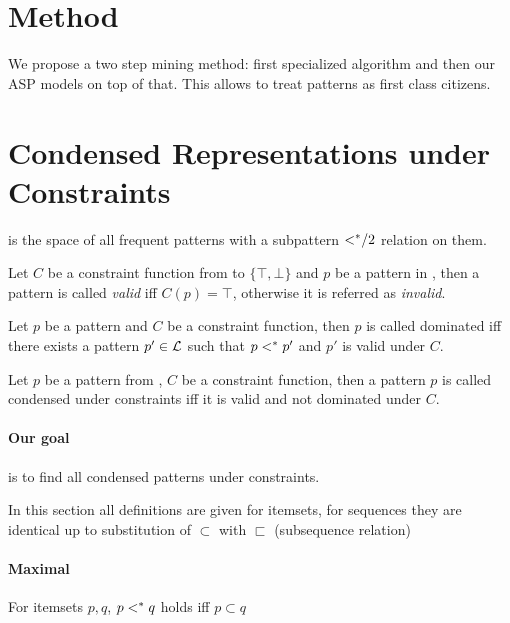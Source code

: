 \section{Method}
We propose a two step mining method: first specialized algorithm and then our ASP models on top of that. This allows to treat patterns as first class citizens. 

\section{Condensed Representations under Constraints}

\patternspace is the space of all frequent patterns with a subpattern ${<^*}/2$ relation on them.

\begin{definition}
  Let $C$ be a constraint function from \patternspace to $\{ \top, \bot \}$ and $p$ be a pattern in \patternspace, then a pattern is called \textit{valid} iff $C(p) = \top$, otherwise it is referred as \textit{invalid}.
\end{definition}

\begin{definition}
 Let  $p$ be a pattern and $C$ be a constraint function, then $p$ is called dominated iff there exists a pattern $p' \in \mathcal{L}$ such that $p <^* p'$ and $p'$ is valid under $C$. 
\end{definition}

\begin{definition}
Let $p$ be a pattern from \patternspace, $C$ be a constraint function, then a pattern $p$ is called condensed under constraints iff it is valid and not dominated under $C$. 
\end{definition}


\paragraph{Our goal} is to find all condensed patterns under constraints.

In this section all definitions are given for itemsets, for sequences they are identical up to substitution of $\subset$ with $\sqsubset$ (subsequence relation) 

\paragraph{Maximal} For itemsets $p,q$, $p <^* q$ holds iff $p \subset q$
